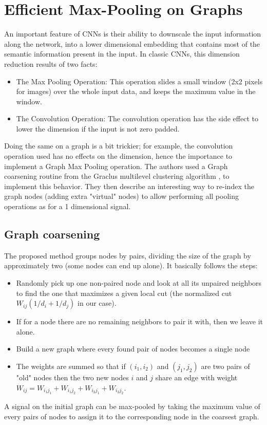 \section{Efficient Max-Pooling on Graphs}

An important feature of CNNs is their ability to downscale the input information along the network, into a lower dimensional embedding that contains most of the semantic information present in the input. In classic CNNs, this dimension reduction results of two facts:
\begin{itemize}
    \item The Max Pooling Operation: This operation slides a small window (2x2 pixels for images) over the whole input data, and keeps the maximum value in the window.
    \item The Convolution Operation: The convolution operation has the side effect to lower the dimension if the input is not zero padded. 
\end{itemize}

Doing the same on a graph is a bit trickier; for example, the convolution operation used has no effects on the dimension, hence the importance to implement a Graph Max Pooling operation. The authors used a Graph coarsening routine from the Graclus multilevel clustering algorithm \cite{dhillon2007weighted}, to implement this behavior. They then describe an interesting way to re-index the graph nodes (adding extra "virtual" nodes) to allow performing all pooling operations as for a 1 dimensional signal. 

\subsection{Graph coarsening}

The proposed method groups nodes by pairs, dividing the size of the graph by approximately two (some nodes can end up alone). It basically follows the steps:
%
\begin{itemize}
    \item Randomly pick up one non-paired node and look at all its unpaired neighbors to find the one that maximizes a given local cut (the normalized cut $W_{ij}(1/d_i + 1/d_j)$ in our case).
    \item If for a node there are no remaining neighbors to pair it with, then we leave it alone.
    \item Build a new graph where every found pair of nodes becomes a single node
    \item The weights are summed so that if $(i_1, i_2)$ and $(j_1, j_2)$ are two pairs of "old" nodes then the two new nodes ${i}$ and ${j}$ share an edge with weight $W_{ij} = W_{i_1 j_1} + W_{i_1 j_2} + W_{i_2 j_1} + W_{i_2 j_2}$.
\end{itemize}
%
A signal on the initial graph can be max-pooled by taking the maximum value of every pairs of nodes to assign it to the corresponding node in the coarsest graph.\\

